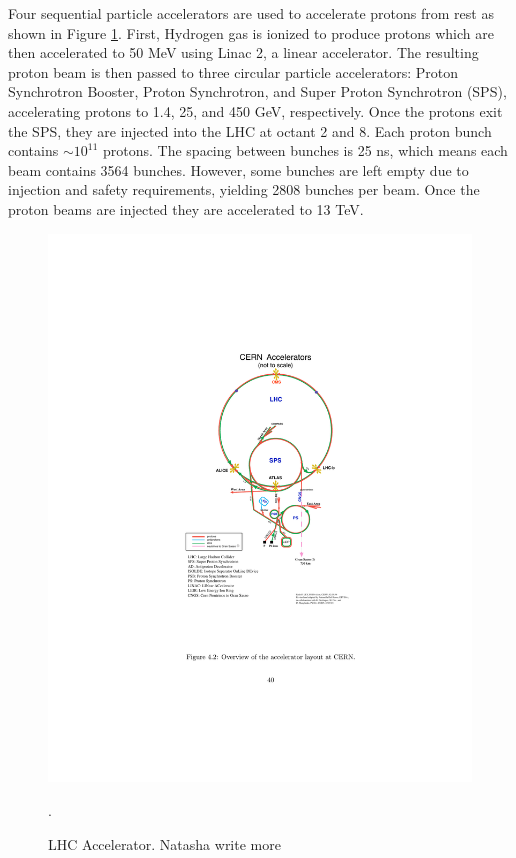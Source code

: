 Four sequential particle accelerators are used to accelerate protons from rest as shown in Figure \ref{fig:lhc_accel}. First, Hydrogen gas is ionized to produce protons which are then accelerated to 50 MeV using Linac 2, a linear accelerator. The resulting proton beam is then passed to three circular particle accelerators: Proton Synchrotron Booster, Proton Synchrotron, and Super Proton Synchrotron (SPS), accelerating protons to 1.4, 25, and 450 GeV, respectively. Once the protons exit the SPS, they are injected into the LHC at octant 2 and 8. Each proton bunch contains $\sim 10^{11}$ protons. The spacing between bunches is 25 ns, which means each beam contains 3564 bunches. However, some bunches are left empty due to injection and safety requirements, yielding 2808 bunches per beam. Once the proton beams are injected they are accelerated to 13 TeV. 


\begin{figure}[h!]
  \centering
  \includegraphics[width=\hsize]{figures/Detector/lhc_accel.pdf}
  \caption{LHC Accelerator. Natasha write more}. 
  \label{fig:lhc_accel}
\end{figure}
\FloatBarrier


